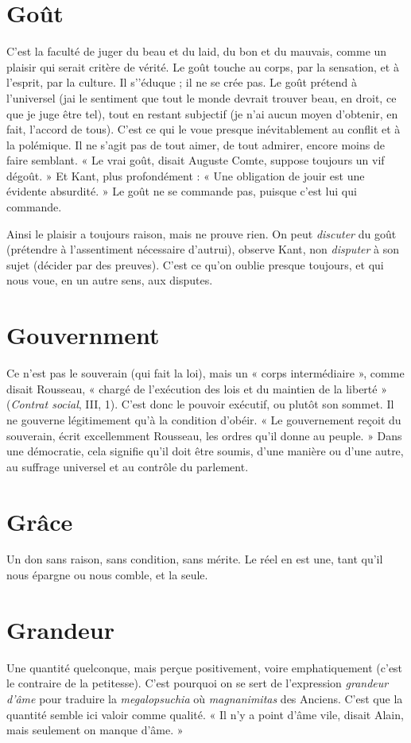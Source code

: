 \section{Goût}
C'est la faculté de juger du beau et du laid, du bon et du mauvais,
comme un plaisir qui serait critère de vérité. Le goût touche au
corps, par la sensation, et à l'esprit, par la culture. Il s’'éduque ; il ne se crée pas.
Le goût prétend à l’universel (jai le sentiment que tout le monde devrait trouver
beau, en droit, ce que je juge être tel), tout en restant subjectif (je n’ai aucun moyen
d'obtenir, en fait, l'accord de tous). C’est ce qui le voue presque inévitablement au
conflit et à la polémique. Il ne s’agit pas de tout aimer, de tout admirer, encore
moins de faire semblant. « Le vrai goût, disait Auguste Comte, suppose toujours un
vif dégoût. » Et Kant, plus profondément : « Une obligation de jouir est une évidente
absurdité. » Le goût ne se commande pas, puisque c’est lui qui commande.

Ainsi le plaisir a toujours raison, mais ne prouve rien. On peut {\it discuter} du
goût (prétendre à l’assentiment nécessaire d’autrui), observe Kant, non {\it disputer}
à son sujet (décider par des preuves). C’est ce qu’on oublie presque toujours, et
qui nous voue, en un autre sens, aux disputes.

\section{Gouvernment}
Ce n'est pas le souverain (qui fait la loi), mais un
« corps intermédiaire », comme disait Rousseau, « chargé
de l'exécution des lois et du maintien de la liberté » ({\it Contrat social}, III, 1). C’est
donc le pouvoir exécutif, ou plutôt son sommet. Il ne gouverne légitimement
qu’à la condition d’obéir. « Le gouvernement reçoit du souverain, écrit excellemment
Rousseau, les ordres qu’il donne au peuple. » Dans une démocratie,
cela signifie qu’il doit être soumis, d’une manière ou d’une autre, au suffrage
universel et au contrôle du parlement.

\section{Grâce}
Un don sans raison, sans condition, sans mérite. Le réel en est une,
tant qu’il nous épargne ou nous comble, et la seule.

\section{Grandeur}
Une quantité quelconque, mais perçue positivement, voire
emphatiquement (c’est le contraire de la petitesse). C’est
pourquoi on se sert de l’expression {\it grandeur d'âme} pour traduire la {\it megalopsuchia}
où {\it magnanimitas} des Anciens. C’est que la quantité semble ici valoir
comme qualité. « Il n’y a point d'âme vile, disait Alain, mais seulement on
manque d'âme. »

